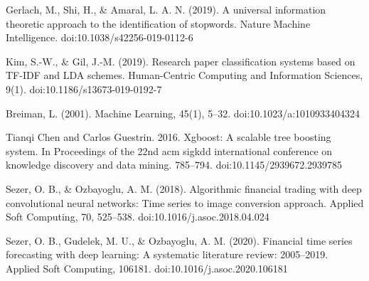 \documentclass[preprint,12pt]{elsarticle}
\begin{document}
\begin{thebibliography}{9}
Gerlach, M., Shi, H., \& Amaral, L. A. N. (2019). A universal information theoretic approach to the identification of stopwords. Nature Machine Intelligence. doi:10.1038/s42256-019-0112-6 

Kim, S.-W., \& Gil, J.-M. (2019). Research paper classification systems based on TF-IDF and LDA schemes. Human-Centric Computing and Information Sciences, 9(1). 
doi:10.1186/s13673-019-0192-7 

Breiman, L. (2001). Machine Learning, 45(1), 5–32. doi:10.1023/a:1010933404324 

Tianqi Chen and Carlos Guestrin. 2016. Xgboost: A scalable tree boosting system. In Proceedings of the 22nd acm sigkdd international conference on knowledge discovery and data mining. 785--794.  
doi:10.1145/2939672.2939785



Sezer, O. B., \& Ozbayoglu, A. M. (2018). Algorithmic financial trading with deep convolutional neural networks: Time series to image conversion approach. Applied Soft Computing, 70, 525–538. doi:10.1016/j.asoc.2018.04.024 

Sezer, O. B., Gudelek, M. U., \& Ozbayoglu, A. M. (2020). Financial time series forecasting with deep learning: A systematic literature review: 2005–2019. Applied Soft Computing, 106181. doi:10.1016/j.asoc.2020.106181 


\end{thebibliography}
\end{document}
